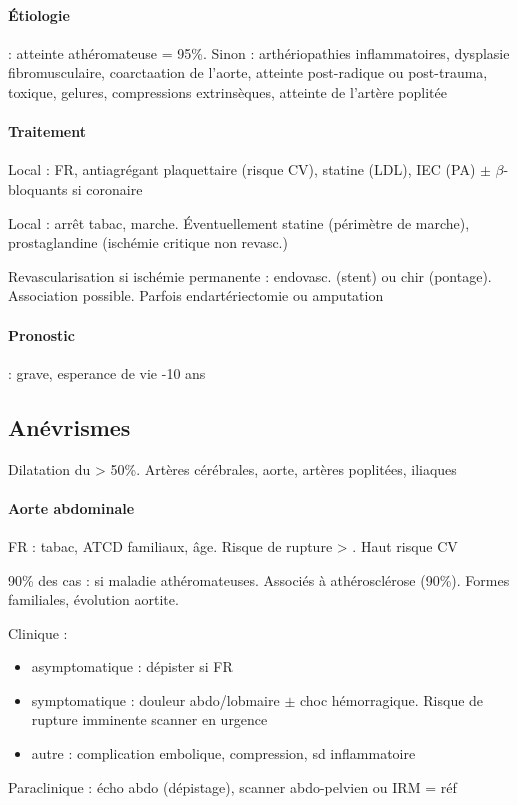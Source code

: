 \paragraph{Étiologie} : atteinte athéromateuse = 95\%. Sinon : arthériopathies
inflammatoires, dysplasie fibromusculaire, coarctaation de l'aorte, atteinte
post-radique ou post-trauma, toxique, gelures, compressions extrinsèques,
atteinte de l'artère poplitée
    
\paragraph{Traitement}
Local : FR, antiagrégant plaquettaire (risque CV), statine (LDL), IEC (PA) $\pm$
$\beta$-bloquants si coronaire

Local : arrêt tabac, marche. Éventuellement statine (périmètre de marche),
prostaglandine (ischémie critique non revasc.)

Revascularisation si ischémie permanente : endovasc. (stent) ou chir (pontage).
Association possible. Parfois endartériectomie ou amputation

\paragraph{Pronostic} : grave, esperance de vie -10 ans

\subsection{Anévrismes}
Dilatation du \diameter{} > 50\%. Artères cérébrales, aorte, artères poplitées, iliaques

\paragraph{Aorte abdominale}
FR : tabac, ATCD familiaux, âge. Risque de rupture > \female. Haut risque CV

90\% des cas : si maladie athéromateuses. Associés à athérosclérose (90\%).
Formes familiales, évolution aortite.

Clinique : 
\begin{itemize}
  \item asymptomatique : dépister si FR
  \item symptomatique : douleur abdo/lobmaire $\pm$ choc hémorragique. Risque de
    rupture imminente \thus scanner en urgence \skull
  \item autre : complication embolique, compression, sd inflammatoire
\end{itemize}
Paraclinique : écho abdo (dépistage), scanner abdo-pelvien ou IRM = réf


